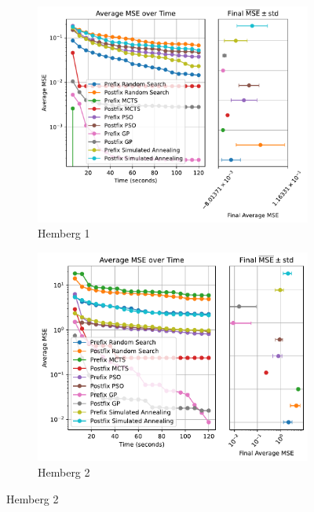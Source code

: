 \documentclass[runningheads]{llncs}
\begin{document}
\begin{figure}
    \centering
    
    \begin{subfigure}{0.49\textwidth}
        \includegraphics[width=\linewidth, keepaspectratio]{Hemberg_Benchmarks/Hemberg_Benchmark_1.pdf}
        \caption{Hemberg 1}
        \label{subfig:hemberg_1}
    \end{subfigure}
    \begin{subfigure}[b]{0.49\textwidth}
        \includegraphics[width=\linewidth, keepaspectratio]{Hemberg_Benchmarks/Hemberg_Benchmark_2.pdf}
        \caption{Hemberg 2}
        \label{subfig:hemberg_2}
    \end{subfigure}
    \vspace{0.4cm}
    

\end{figure}
\end{document}
